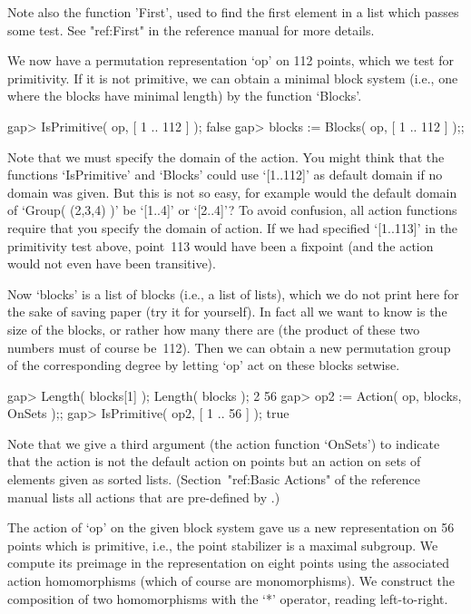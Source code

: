Note also  the function 'First', used to  find the  first element in a
list which  passes some test. See  "ref:First" in the reference manual
for more details.

We now have a permutation representation `op' on 112 points, which we
test for primitivity. If it is not primitive, we can obtain a minimal
block system (i.e., one where the blocks have minimal length) by the
function `Blocks'.

\beginexample
gap> IsPrimitive( op, [ 1 .. 112 ] );
false
gap> blocks := Blocks( op, [ 1 .. 112 ] );;
\endexample

Note that we  must specify the domain  of the action. You  might think
that the   functions `IsPrimitive' and `Blocks'  could  use `[1..112]' as
default  domain if no  domain was  given. But  this  is not so  easy, for
example  would the default domain  of `Group(  (2,3,4)  )' be `[1..4]' or
`[2..4]'? To  avoid confusion, all action  functions  require that you
specify  the domain of action. If  we had specified  `[1..113]' in the
primitivity test above,  point~113  would have been  a fixpoint  (and the
action would not even have been transitive).

Now `blocks' is a list of blocks (i.e., a list of lists), which we do not
print  here for the  sake of saving paper (try  it for yourself). In fact
all we want to know is the size of  the blocks, or  rather how many there
are (the product of these two numbers must of course be~112). Then we can
obtain a new  permutation group  of the  corresponding  degree by letting
`op' act on these blocks setwise.

\beginexample
gap> Length( blocks[1] );  Length( blocks );
2
56
gap> op2 := Action( op, blocks, OnSets );;
gap> IsPrimitive( op2, [ 1 .. 56 ] );
true
\endexample

Note that we give a third argument (the action function `OnSets') to
indicate that the action is not the default action on points but an
action on sets of elements given as sorted lists.
(Section~"ref:Basic Actions" of the reference manual lists all
actions that are pre-defined by {\GAP}.)

The action of `op' on the given block system gave us a new representation
on 56 points which is primitive, i.e., the  point stabilizer is a maximal
subgroup. We  compute its preimage in the  representation on eight points
using the   associated   action homomorphisms (which   of   course are
monomorphisms). We construct  the  composition of two  homomorphisms with
the `*' operator, reading left-to-right.

